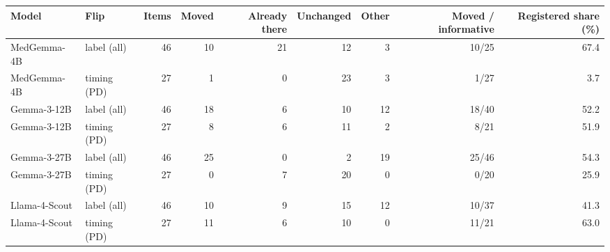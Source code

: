 \begin{tabular}{llrrrrrrr}
\toprule
Model & Flip & Items & Moved & Already there & Unchanged & Other & Moved / informative & Registered share (\%) \\
\midrule
MedGemma-4B & label (all) & 46 & 10 & 21 & 12 & 3 & 10/25 & 67.4 \\
MedGemma-4B & timing (PD) & 27 & 1 & 0 & 23 & 3 & 1/27 & 3.7 \\
Gemma-3-12B & label (all) & 46 & 18 & 6 & 10 & 12 & 18/40 & 52.2 \\
Gemma-3-12B & timing (PD) & 27 & 8 & 6 & 11 & 2 & 8/21 & 51.9 \\
Gemma-3-27B & label (all) & 46 & 25 & 0 & 2 & 19 & 25/46 & 54.3 \\
Gemma-3-27B & timing (PD) & 27 & 0 & 7 & 20 & 0 & 0/20 & 25.9 \\
Llama-4-Scout & label (all) & 46 & 10 & 9 & 15 & 12 & 10/37 & 41.3 \\
Llama-4-Scout & timing (PD) & 27 & 11 & 6 & 10 & 0 & 11/21 & 63.0 \\
\bottomrule
\end{tabular}
